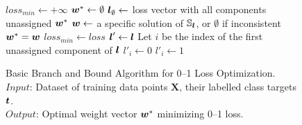 \begin{figure}
\caption{
Basic Branch and Bound Algorithm for 0--1 Loss Optimization. \\
\text{\hspace{2.2cm}} $Input$: Dataset of training data points $ \boldsymbol{X}$, their labelled class targets $\boldsymbol{t}$. \\
\text{\hspace{2.2cm}} $Output$: Optimal weight vector $\boldsymbol{w}^*$ minimizing 0--1 loss.
}
\label{alg:BnB.Basic}
\begin{algorithmic}[1]
 
\State $loss_{min} \gets +\infty$
\State $\boldsymbol{w}^* \gets \emptyset$
\State $\boldsymbol{l}_\emptyset \gets $ loss vector with all components unassigned
\State {}
\State \Return $\boldsymbol{w}^*$
\Statex
{}
      \State $\boldsymbol{w} \gets$ a specific solution of $\mathbb{S}_{\boldsymbol{l}}$, or $\emptyset$ if inconsistent 
      \If {$\w \not= \emptyset$}
         \State $\boldsymbol{w}^* = \boldsymbol{w}$
         \State $loss_{min} \gets loss$
      \EndIf
   \Else
      \State $\boldsymbol{l}' \gets \boldsymbol{l}$
      \State Let $i$ be the index of the first unassigned component of $\boldsymbol{l}$
      \State $l'_i \gets 0$
      \State {}
         \State $l'_i \gets 1$
         \State {}
      \EndIf
   \EndIf
\EndProcedure
\Statex
\EndFunction
\end{algorithmic}
\end{figure}

